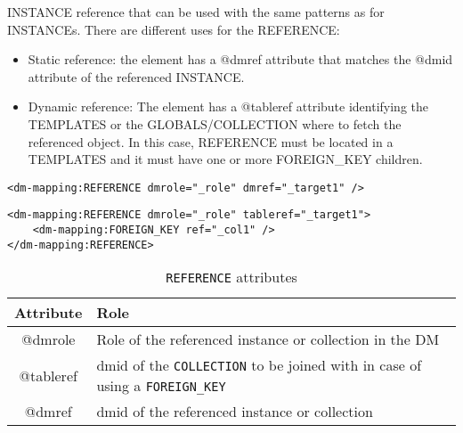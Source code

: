 INSTANCE reference that can be used with the same patterns as for INSTANCEs.
There are different uses for the REFERENCE:

\begin{itemize}
    \item Static reference: the element has a @dmref attribute that matches the @dmid attribute of the referenced INSTANCE.
    \item Dynamic reference: The element has a @tableref attribute identifying the TEMPLATES or the GLOBALS/COLLECTION where to fetch the referenced object. 
             In this case, REFERENCE must be located in a TEMPLATES and it must have one or more FOREIGN\_KEY children.
\end{itemize}

\begin{lstlisting}[frame=single,caption={Simple \texttt{REFERENCE}, to be replaced with the INSTANCE having @dmid=\_target1 },style=XML,basicstyle=\tiny]
<dm-mapping:REFERENCE dmrole="_role" dmref="_target1" />
\end{lstlisting}

\begin{lstlisting}[frame=single,caption={Dynamic \texttt{REFERENCE}, to be replaced with the INSTANCE of the table of collection \_target1 and having a PRIMARY\_KEY matching the value of column  \_col1. This pattern is valid in the context of a TEMPLATES},style=XML,basicstyle=\tiny]
<dm-mapping:REFERENCE dmrole="_role" tableref="_target1">
    <dm-mapping:FOREIGN_KEY ref="_col1" />
</dm-mapping:REFERENCE>
\end{lstlisting}

\begin{table}[!htbp]
\small
\centering
\begin{tabulary}{\linewidth}{|c|J|}       
       \hline 
            \textbf{Attribute} & 
            \textbf {Role}\\
       \hline         \hline  
            @dmrole & 
            Role of the referenced instance or collection in the DM \\
        \hline 
            @tableref& 
            dmid of the \texttt{COLLECTION} to be joined with in case of using a \texttt{FOREIGN\_KEY} \\
        \hline 
            @dmref & 
            dmid of the referenced instance or collection\\
        \hline 
     \end{tabulary}
     \caption{\texttt{REFERENCE} attributes} 
     \label{tbl:reference-att}
 \end{table}

